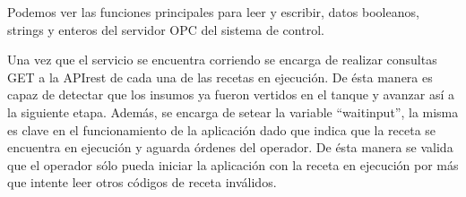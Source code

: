 Podemos ver las funciones principales para leer y escribir, datos booleanos, strings y enteros del servidor OPC del sistema de control.

Una vez que el servicio se encuentra corriendo se encarga de realizar consultas GET a la APIrest de cada una de las recetas en ejecución. De ésta manera es capaz de detectar que los insumos ya fueron vertidos en el tanque y avanzar así a la siguiente etapa. Además, se encarga de setear la variable ``waitinput'', la misma es clave en el funcionamiento de la aplicación dado que indica que la receta se encuentra en ejecución y aguarda órdenes del operador. De ésta manera se valida que el operador sólo pueda iniciar la aplicación con la receta en ejecución por más que intente leer otros códigos de receta inválidos. 



